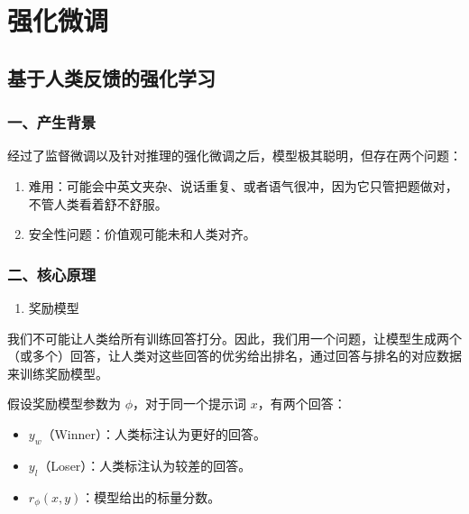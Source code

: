 \hypertarget{ux5f3aux5316ux5faeux8c03}{%
\chapter{强化微调}\label{ux5f3aux5316ux5faeux8c03}}

\hypertarget{ux57faux4e8eux4ebaux7c7bux53cdux9988ux7684ux5f3aux5316ux5b66ux4e60}{%
\section{基于人类反馈的强化学习}\label{ux57faux4e8eux4ebaux7c7bux53cdux9988ux7684ux5f3aux5316ux5b66ux4e60}}

\hypertarget{ux4e00ux4ea7ux751fux80ccux666f}{%
\subsection{一、产生背景}\label{ux4e00ux4ea7ux751fux80ccux666f}}

经过了监督微调以及针对推理的强化微调之后，模型极其聪明，但存在两个问题：

\begin{enumerate}
\def\labelenumi{\arabic{enumi}.}
\item
  难用：可能会中英文夹杂、说话重复、或者语气很冲，因为它只管把题做对，不管人类看着舒不舒服。
\item
  安全性问题：价值观可能未和人类对齐。
\end{enumerate}

\hypertarget{ux4e8cux6838ux5fc3ux539fux7406}{%
\subsection{二、核心原理}\label{ux4e8cux6838ux5fc3ux539fux7406}}

\begin{enumerate}
\def\labelenumi{\arabic{enumi}.}
\tightlist
\item
  奖励模型
\end{enumerate}

我们不可能让人类给所有训练回答打分。因此，我们用一个问题，让模型生成两个（或多个）回答，让人类对这些回答的优劣给出排名，通过回答与排名的对应数据来训练奖励模型。

假设奖励模型参数为 \(\phi\)，对于同一个提示词 \(x\)，有两个回答：

\begin{itemize}
\tightlist
\item
  \(y_w\)（Winner）：人类标注认为更好的回答。
\item
  \(y_l\)（Loser）：人类标注认为较差的回答。
\item
  \(r_\phi(x,y)\)：模型给出的标量分数。
\end{itemize}

